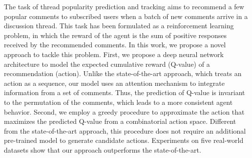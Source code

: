 The task of thread popularity prediction and tracking aims to recommend a few popular comments to subscribed users when a batch of new comments arrive in a discussion thread. This task has been formulated as a reinforcement learning problem, in which the reward of the agent is the sum of positive responses received by the recommended comments. In this work, we propose a novel approach to tackle this problem. First, we propose a deep neural network architecture to model the expected cumulative reward (Q-value) of a recommendation (action). Unlike the state-of-the-art approach, which treats an action as a sequence, our model uses an attention mechanism to integrate information from a set of comments. Thus, the prediction of Q-value is invariant to the permutation of the comments, which leads to a more consistent agent behavior. Second, we employ a greedy procedure to approximate the action that maximizes the predicted Q-value from a combinatorial action space. Different from the state-of-the-art approach, this procedure does not require an additional pre-trained model to generate candidate actions. Experiments on five real-world datasets show that our approach outperforms the state-of-the-art.
